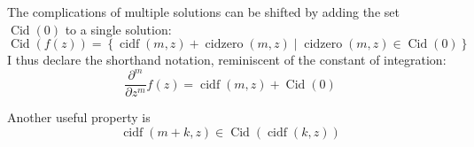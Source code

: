 \documentclass[]{article}
\DeclareMathOperator{\cidf}{cidf}
\DeclareMathOperator{\cidzero}{cidzero}
\DeclareMathOperator{\Cid}{Cid}
\newcommand{\pqty}[1]{{\left(#1\right)}}
\newcommand{\Bqty}[1]{{\left\{#1\right\}}}
\newcommand{\pdiff}[2]{\frac{\partial^{#2}}{\partial #1^{#2}}}
\numberwithin{equation}{section}
\begin{document}
	The complications of multiple solutions can be shifted by adding the set $\Cid\pqty{0}$ to a single solution:
	\begin{equation}
		\Cid\pqty{f\pqty{z}}=
		\Bqty{\cidf\pqty{m,z}+\cidzero\pqty{m,z} \mid \cidzero\pqty{m,z}\in\Cid\pqty{0}}
	\end{equation}
	I thus declare the shorthand notation, reminiscent of the constant of integration:
	\begin{equation}
		\pdiff{z}{m}f\pqty{z}=\cidf\pqty{m,z}+\Cid\pqty{0}
	\end{equation}
	
	Another useful property is
	\begin{equation}
		\label{cid m+k}
		\cidf\pqty{m+k,z}\in\Cid\pqty{\cidf\pqty{k,z}}
	\end{equation}
\end{document}
